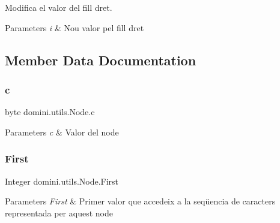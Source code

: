 Modifica el valor del fill dret. 


\begin{DoxyParams}{Parameters}
{\em i} & Nou valor pel fill dret \\
\hline
\end{DoxyParams}


\subsection{Member Data Documentation}
\mbox{\label{classdomini_1_1utils_1_1Node_a2fbef2557db813ae02a2d52032eaa6e1}} 
\subsubsection{\texorpdfstring{c}{c}}
{\footnotesize\ttfamily byte domini.\+utils.\+Node.\+c\hspace{0.3cm}{\ttfamily [package]}}


\begin{DoxyParams}{Parameters}
{\em c} & Valor del node \\
\hline
\end{DoxyParams}
\mbox{\label{classdomini_1_1utils_1_1Node_a42db9f259f129c72cab2052a0f8ba42a}} 
\subsubsection{\texorpdfstring{First}{First}}
{\footnotesize\ttfamily Integer domini.\+utils.\+Node.\+First\hspace{0.3cm}{\ttfamily [package]}}


\begin{DoxyParams}{Parameters}
{\em First} & Primer valor que accedeix a la seqüencia de caracters representada per aquest node \\
\hline
\end{DoxyParams}
\mbox{\label{classdomini_1_1utils_1_1Node_a2f1d911cf52953b29d42e5e020b82dbf}} 
